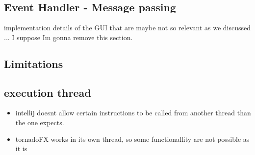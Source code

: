 
		\subsection{Event Handler - Message passing}
		implementation details of the GUI that are maybe not so relevant as we discussed ... I suppose Im gonna remove this section.




	\subsection{Limitations}


		\subsection{execution thread}
		\begin{itemize}
			\item intellij doesnt allow certain instructions to be called from another thread than the one expects.
			\item tornadoFX works in its own thread, so some functionallity are not possible as it is
		\end{itemize}